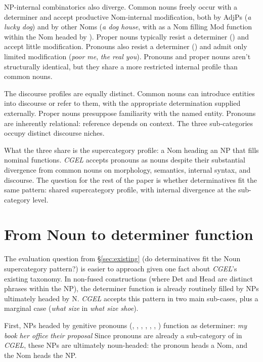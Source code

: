 \documentclass[12pt]{article}
\begin{document}
NP-internal combinatorics also diverge. Common nouns freely occur with a determiner and accept productive Nom-internal modification, both by AdjPs (\textit{a lucky dog}) and by other Noms (\textit{a dog house}, with  as a Nom filling Mod function within the Nom headed by ). Proper nouns typically resist a determiner () and accept little modification. Pronouns also resist a determiner () and admit only limited modification (\textit{poor me}, \textit{the real you}). Pronouns and proper nouns aren't structurally identical, but they share a more restricted internal profile than common nouns.

The discourse profiles are equally distinct. Common nouns can introduce entities into discourse or refer to them, with the appropriate determination supplied externally. Proper nouns presuppose familiarity with the named entity. Pronouns are inherently relational: reference depends on context. The three sub-categories occupy distinct discourse niches.

What the three share is the supercategory profile: a Nom heading an NP that fills nominal functions. \textit{CGEL} accepts pronouns as nouns despite their substantial divergence from common nouns on morphology, semantics, internal syntax, and discourse. The question for the rest of the paper is whether determinatives fit the same pattern: shared supercategory profile, with internal divergence at the sub-category level.

\section{From Noun to determiner function}\label{sec:bridge}

The evaluation question from §\ref{sec:existing} (do determinatives fit the Noun supercategory pattern?) is easier to approach given one fact about \textit{CGEL}'s existing taxonomy. In non-fused constructions (where Det and Head are distinct phrases within the NP), the determiner function is already routinely filled by NPs ultimately headed by N. \textit{CGEL} accepts this pattern in two main sub-cases, plus a marginal case (\textit{what size} in \textit{what size shoe}).

First, NPs headed by genitive pronouns (, , , , , , ) function as determiner:
\ea\label{ex:pronoun-det}
\ea \textit{my book}
\ex \textit{her office}
\ex \textit{their proposal}
\z
\z
Since pronouns are already a sub-category of  in \textit{CGEL}, these NPs are ultimately noun-headed: the pronoun heads a Nom, and the Nom heads the NP.
\end{document}
